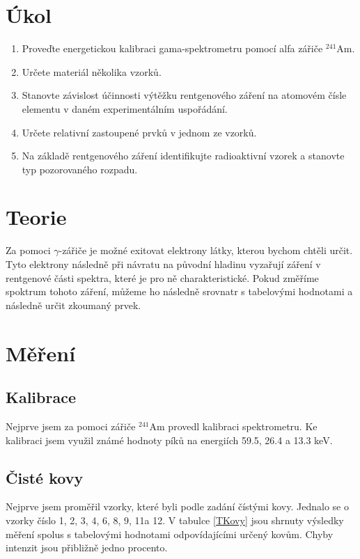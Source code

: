 \documentclass[a4paper,12pt]{article}
\begin{document}
\section{Úkol}
\begin{enumerate}
\item   Proveďte energetickou kalibraci gama-spektrometru pomocí alfa zářiče $^{241}$Am.
\item   Určete materiál několika vzorků.
\item   Stanovte závislost účinnosti výtěžku rentgenového záření na atomovém čísle elementu v daném experimentálním uspořádání.
\item   Určete relativní zastoupené prvků v jednom ze vzorků.
\item   Na základě rentgenového záření identifikujte radioaktivní vzorek a stanovte typ pozorovaného rozpadu.
\end{enumerate}

\section{Teorie}
Za pomoci $\gamma$-zářiče je možné exitovat elektrony látky, kterou bychom chtěli určit. Tyto elektrony následně při návratu na původní hladinu vyzařují záření v rentgenové části spektra, které je pro ně charakteristické. Pokud změříme spoktrum tohoto záření, můžeme ho následně srovnatr s tabelovými hodnotami a následně určit zkoumaný prvek.

\section{Měření}
\subsection{Kalibrace}
Nejprve jsem za pomoci zářiče $^{241}$Am provedl kalibraci spektrometru. Ke kalibraci jsem využil známé hodnoty píků na energiích 59.5, 26.4 a 13.3 keV.

\subsection{Čisté kovy}
Nejprve jsem proměřil vzorky, které byli podle zadání čístými kovy. Jednalo se o vzorky číslo 1, 2, 3, 4, 6, 8, 9, 11a 12. V tabulce \ref{TKovy} jsou shrnuty výsledky měření spolus s tabelovými hodnotami odpovídajícími určený kovům.
Chyby intenzit jsou přibližně jedno procento.
\end{document}
